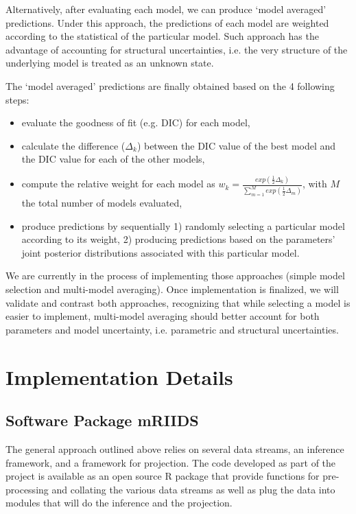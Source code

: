\documentclass[11pt,]{article}
\begin{document}
Alternatively, after evaluating each model, we can produce `model averaged' predictions. Under this approach, the predictions
of each model are weighted according to the statistical of the particular model. Such approach has the advantage of accounting
for structural uncertainties, i.e. the very structure of the underlying model is treated as an unknown state.

The `model averaged' predictions are finally obtained based on the 4
following steps:

\begin{itemize}
\item evaluate the goodness of fit (e.g. DIC) for each model,
\item calculate the difference ($\Delta_k$) between the DIC value of the best model and the DIC value for each of the other models,
\item compute the relative weight for each model as $w_k = \frac{exp(\frac{1}{2}\Delta_k)}{\sum_{m = 1}^{M}{exp(\frac{1}{2}\Delta_m)}}$, with $M$ the total number of models evaluated,
\item produce predictions by sequentially 1) randomly selecting a particular model according to its weight, 2) producing predictions based on the parameters' joint posterior distributions associated with this particular model.
\end{itemize}

We are currently in the process of implementing those approaches (simple model selection and multi-model averaging).
Once implementation is finalized, we will validate and contrast both approaches, recognizing that while selecting a model 
is easier to implement, multi-model averaging should better
account for both parameters and model uncertainty, i.e. parametric and structural uncertainties.


\section{Implementation Details}
\subsection{Software Package mRIIDS}

The general approach outlined above relies on several data streams, an
inference framework, and a framework for projection. The code
developed as part of the project is available as an open
source R package that provide functions for pre-processing and
collating the various data streams as well as plug the data into
modules that will do the inference and the projection. 
\end{document}
